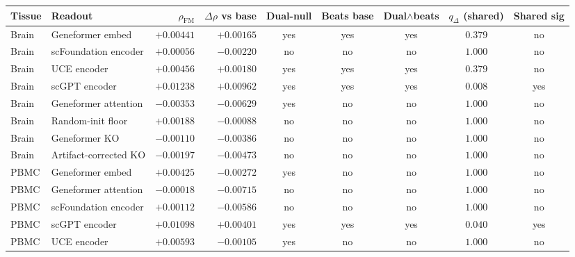 \begin{tabular}{llrrccccc}
\toprule
Tissue & Readout & $\rho_{\mathrm{FM}}$ & $\Delta\rho$ vs base & Dual-null & Beats base & Dual$\wedge$beats & $q_{\Delta}$ (shared) & Shared sig \\
\midrule
Brain & Geneformer embed & $+0.00441$ & $+0.00165$ & yes & yes & yes & $0.379$ & no \\
Brain & scFoundation encoder & $+0.00056$ & $-0.00220$ & no & no & no & $1.000$ & no \\
Brain & UCE encoder & $+0.00456$ & $+0.00180$ & yes & yes & yes & $0.379$ & no \\
Brain & scGPT encoder & $+0.01238$ & $+0.00962$ & yes & yes & yes & $0.008$ & yes \\
Brain & Geneformer attention & $-0.00353$ & $-0.00629$ & yes & no & no & $1.000$ & no \\
Brain & Random-init floor & $+0.00188$ & $-0.00088$ & no & no & no & $1.000$ & no \\
Brain & Geneformer KO & $-0.00110$ & $-0.00386$ & no & no & no & $1.000$ & no \\
Brain & Artifact-corrected KO & $-0.00197$ & $-0.00473$ & no & no & no & $1.000$ & no \\
PBMC & Geneformer embed & $+0.00425$ & $-0.00272$ & yes & no & no & $1.000$ & no \\
PBMC & Geneformer attention & $-0.00018$ & $-0.00715$ & no & no & no & $1.000$ & no \\
PBMC & scFoundation encoder & $+0.00112$ & $-0.00586$ & no & no & no & $1.000$ & no \\
PBMC & scGPT encoder & $+0.01098$ & $+0.00401$ & yes & yes & yes & $0.040$ & yes \\
PBMC & UCE encoder & $+0.00593$ & $-0.00105$ & yes & no & no & $1.000$ & no \\
\bottomrule
\end{tabular}
